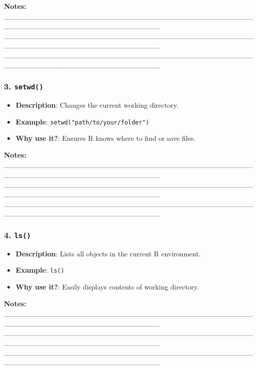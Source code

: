 \documentclass[
  11pt,
]{article}
\providecommand{\tightlist}{%
  \setlength{\itemsep}{0pt}\setlength{\parskip}{0pt}}
\begin{document}
\textbf{Notes:}
\_\_\_\_\_\_\_\_\_\_\_\_\_\_\_\_\_\_\_\_\_\_\_\_\_\_\_\_\_\_\_\_\_\_\_\_\_\_\_\_\_\_\_\_\_\_\_\_\_\_\_\_\_\_\_\_\_\_\_\_\_\_\_\_\_\_\_\_\_\_\_\_\_\_\_\_\_\_
\_\_\_\_\_\_\_\_\_\_\_\_\_\_\_\_\_\_\_\_\_\_\_\_\_\_\_\_\_\_\_\_\_\_\_\_\_\_\_\_\_\_\_\_\_\_\_\_\_\_\_\_\_\_\_\_\_\_\_\_\_\_\_\_\_\_\_\_\_\_\_\_\_\_\_\_\_\_
\_\_\_\_\_\_\_\_\_\_\_\_\_\_\_\_\_\_\_\_\_\_\_\_\_\_\_\_\_\_\_\_\_\_\_\_\_\_\_\_\_\_\_\_\_\_\_\_\_\_\_\_\_\_\_\_\_\_\_\_\_\_\_\_\_\_\_\_\_\_\_\_\_\_\_\_\_\_

\subsubsection{\texorpdfstring{3.
\texttt{setwd()}}{3. setwd()}}\label{setwd}

\begin{itemize}
\tightlist
\item
  \textbf{Description}: Changes the current working directory.
\item
  \textbf{Example}: \texttt{setwd("path/to/your/folder")}
\item
  \textbf{Why use it?}: Ensures R knows where to find or save files.
\end{itemize}

\textbf{Notes:}
\_\_\_\_\_\_\_\_\_\_\_\_\_\_\_\_\_\_\_\_\_\_\_\_\_\_\_\_\_\_\_\_\_\_\_\_\_\_\_\_\_\_\_\_\_\_\_\_\_\_\_\_\_\_\_\_\_\_\_\_\_\_\_\_\_\_\_\_\_\_\_\_\_\_\_\_\_\_
\_\_\_\_\_\_\_\_\_\_\_\_\_\_\_\_\_\_\_\_\_\_\_\_\_\_\_\_\_\_\_\_\_\_\_\_\_\_\_\_\_\_\_\_\_\_\_\_\_\_\_\_\_\_\_\_\_\_\_\_\_\_\_\_\_\_\_\_\_\_\_\_\_\_\_\_\_\_
\_\_\_\_\_\_\_\_\_\_\_\_\_\_\_\_\_\_\_\_\_\_\_\_\_\_\_\_\_\_\_\_\_\_\_\_\_\_\_\_\_\_\_\_\_\_\_\_\_\_\_\_\_\_\_\_\_\_\_\_\_\_\_\_\_\_\_\_\_\_\_\_\_\_\_\_\_\_

\subsubsection{\texorpdfstring{4. \texttt{ls()}}{4. ls()}}\label{ls}

\begin{itemize}
\tightlist
\item
  \textbf{Description}: Lists all objects in the current R environment.
\item
  \textbf{Example}: \texttt{ls()}
\item
  \textbf{Why use it?}: Easily displays contents of working directory.
\end{itemize}

\textbf{Notes:}
\_\_\_\_\_\_\_\_\_\_\_\_\_\_\_\_\_\_\_\_\_\_\_\_\_\_\_\_\_\_\_\_\_\_\_\_\_\_\_\_\_\_\_\_\_\_\_\_\_\_\_\_\_\_\_\_\_\_\_\_\_\_\_\_\_\_\_\_\_\_\_\_\_\_\_\_\_\_
\_\_\_\_\_\_\_\_\_\_\_\_\_\_\_\_\_\_\_\_\_\_\_\_\_\_\_\_\_\_\_\_\_\_\_\_\_\_\_\_\_\_\_\_\_\_\_\_\_\_\_\_\_\_\_\_\_\_\_\_\_\_\_\_\_\_\_\_\_\_\_\_\_\_\_\_\_\_
\_\_\_\_\_\_\_\_\_\_\_\_\_\_\_\_\_\_\_\_\_\_\_\_\_\_\_\_\_\_\_\_\_\_\_\_\_\_\_\_\_\_\_\_\_\_\_\_\_\_\_\_\_\_\_\_\_\_\_\_\_\_\_\_\_\_\_\_\_\_\_\_\_\_\_\_\_\_
\end{document}
